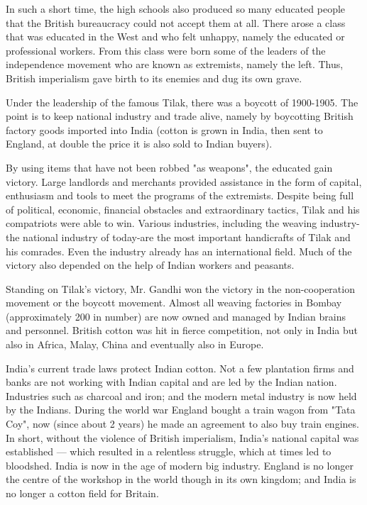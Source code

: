 In such a short time, the high schools also produced so many educated people that the British 
bureaucracy could not accept them at all. There arose a class that was educated in the West and 
who felt unhappy, namely the educated or professional workers. From this class were born some of 
the leaders of the independence movement who are known as extremists, namely the left. Thus, 
British imperialism gave birth to its enemies and dug its own grave.\vskip 0.2in

Under the leadership of the famous Tilak, there was a boycott of 1900-1905. 
The point is to keep national industry and trade alive, namely by boycotting 
British factory goods imported into India (cotton is grown in India, then sent 
to England, at double the price it is also sold to Indian buyers).\vskip 0.2in

By using items that have not been robbed "as weapons", the educated gain victory. 
Large landlords and merchants provided assistance in the form of capital, enthusiasm 
and tools to meet the programs of the extremists. Despite being full of political, 
economic, financial obstacles and extraordinary tactics, Tilak and his compatriots 
were able to win. Various industries, including the weaving industry-the national 
industry of today-are the most important handicrafts of Tilak and his comrades. 
Even the industry already has an international field. Much of the victory also depended on the help of Indian workers and peasants.\vskip 0.2in

Standing on Tilak's victory, Mr. Gandhi won the victory in the non-cooperation movement 
or the boycott movement. Almost all weaving factories in Bombay (approximately 200 in number) 
are now owned and managed by Indian brains and personnel. British cotton was hit in fierce 
competition, not only in India but also in Africa, Malay, China and eventually also in Europe.\vskip 0.2in

India's current trade laws protect Indian cotton. Not a few plantation firms and banks 
are not working with Indian capital and are led by the Indian nation. Industries such 
as charcoal and iron; and the modern metal industry is now held by the Indians. During 
the world war England bought a train wagon from "Tata Coy", now (since about 2 years) 
he made an agreement to also buy train engines. In short, without the violence of British 
imperialism, India's national capital was established — which resulted in a relentless 
struggle, which at times led to bloodshed. India is now in the age of modern big industry. 
England is no longer the centre of the workshop in the world though in its own kingdom; and 
India is no longer a cotton field for Britain.\vskip 0.2in


